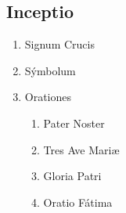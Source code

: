 \subsection*{Inceptio}

\begin{enumerate}[label={\roman*.}, itemsep=0pt]

\item Signum Crucis
\item S\'ymbolum
\item Orationes
\vspace{-0.5em}
\begin{enumerate}[label={\alph*.}, itemsep=0pt]
    \item Pater Noster
    \item Tres Ave Mariæ
    \item Gloria Patri
    \item Oratio F\'atima
\end{enumerate}
\vspace{-0.5em}
\end{enumerate}